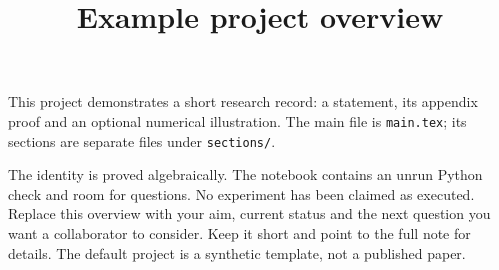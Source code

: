 \documentclass[11pt]{article}
\title{Example project overview}
\author{}
\date{}
\begin{document}
\maketitle
This project demonstrates a short research record: a statement, its appendix
proof and an optional numerical illustration. The main file is \texttt{main.tex};
its sections are separate files under \texttt{sections/}.

The identity is proved algebraically. The notebook contains an unrun Python
check and room for questions. No experiment has been claimed as executed.
Replace this overview with your aim, current status and the next question you
want a collaborator to consider. Keep it short and point to the full note for
details. The default project is a synthetic template, not a published paper.
\end{document}
